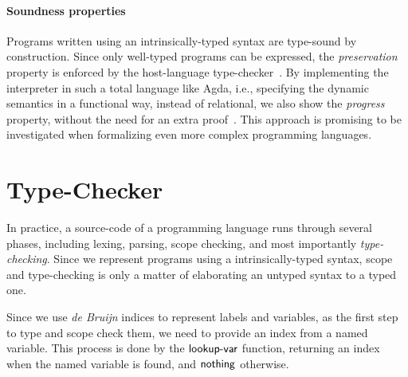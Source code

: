 \documentclass[sigconf]{acmart}
\theoremstyle{definition}
\newcommand{\Con}[1]{\red{\mathsf{#1}}}
\newcommand{\F}[1]{\green{\mathsf{#1}}}
\begin{document}

\paragraph{Soundness properties}{Programs written using an intrinsically-typed syntax are type-sound by
construction. Since only well-typed programs can be expressed, the \emph{preservation} property is
enforced by the host-language type-checker~\cite{Amin17}. By implementing the interpreter in such a
total language like Agda, i.e., specifying the dynamic semantics in a functional way, instead of
relational, we also show the \emph{progress} property, without the need for an extra proof~\cite{Owens2016}.
This approach is promising to be investigated when formalizing even more complex programming languages.}

\section{Type-Checker}\label{sec:typechecker}

In practice, a source-code of a programming language runs through several phases, including lexing, parsing,
scope checking, and most importantly \emph{type-checking}. Since we represent programs using a
intrinsically-typed syntax, scope and type-checking is only a matter of elaborating an untyped syntax
to a typed one.


Since we use \emph{de Bruijn} indices to represent labels and variables, as the first step to type and scope
check them, we need to provide an index from a named variable. This process is done by the
\ensuremath{\F{lookup\textrm{-}var}} function, returning an index when the named variable is found, and \ensuremath{\Con{nothing}} otherwise.

\pagebreak
\end{document}
